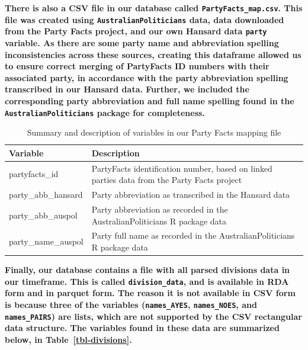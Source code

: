 \documentclass[
  letterpaper,
  DIV=11,
  numbers=noendperiod]{scrartcl}
\begin{document}
\textbf{There is also a CSV file in our database called
\texttt{PartyFacts\_map.csv}. This file was created using
\texttt{AustralianPoliticians} data, data downloaded from the Party
Facts project, and our own Hansard data \texttt{party} variable. As
there are some party name and abbreviation spelling inconsistencies
across these sources, creating this dataframe allowed us to ensure
correct merging of PartyFacts ID numbers with their associated party, in
accordance with the party abbreviation spelling transcribed in our
Hansard data. Further, we included the corresponding party abbreviation
and full name spelling found in the \texttt{AustralianPoliticians}
package for completeness.}

\hypertarget{tbl-partyfacts-vars}{}
\begin{table}[H]
\caption{\label{tbl-partyfacts-vars}Summary and description of variables in our Party Facts mapping file }\tabularnewline

\centering
\begin{tabular}{>{\raggedright\arraybackslash}p{10em}>{\raggedright\arraybackslash}p{25em}}
\toprule
Variable & Description\\
\midrule
partyfacts\_id & PartyFacts identification number, based on linked parties data from the Party Facts project\\
party\_abb\_hansard & Party abbreviation as transcribed in the Hansard data\\
party\_abb\_auspol & Party abbreviation as recorded in the AustralianPoliticians R package data\\
party\_name\_auspol & Party full name as recorded in the AustralianPoliticians R package data\\
\bottomrule
\end{tabular}
\end{table}

\textbf{Finally, our database contains a file with all parsed divisions
data in our timeframe. This is called \texttt{division\_data}, and is
available in RDA form and in parquet form. The reason it is not
available in CSV form is because three of the variables
(\texttt{names\_AYES}, \texttt{names\_NOES}, and \texttt{names\_PAIRS})
are lists, which are not supported by the CSV rectangular data
structure. The variables found in these data are summarized below, in
Table~\ref{tbl-divisions}.}
\end{document}
